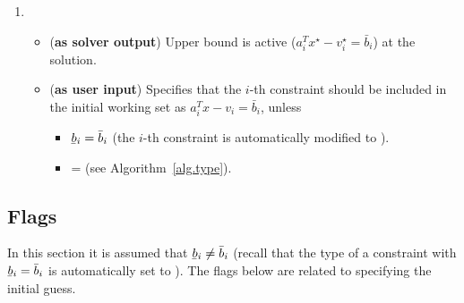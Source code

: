 \documentclass[12pt,a4paper]{article}
\newcommand{\ubar}[1]{\underaccent{\bar}{#1}}
\begin{document}
\begin{enumerate}
\item {}

  \begin{itemize}
  \item ({\bf as solver output}) Upper bound is active ($a_i^Tx^{\star} - v_i^{\star} = \bar{b}_i$) at the solution.
  \item ({\bf as user input}) Specifies that the $i$-th constraint should be included in the
    initial working set as $a_i^Tx - v_i = \bar{b}_i$, unless
    \begin{itemize}
    \item[\ding{237}] $\ubar{b}_i = \bar{b}_i$ (the $i$-th constraint is automatically modified to
      ).
    \item[\ding{237}]  =  (see Algorithm~\ref{alg.type}).
    \end{itemize}
  \end{itemize}

\end{enumerate}

\subsection{Flags}

In this section it is assumed that $\ubar{b}_i \neq \bar{b}_i$ (recall that the type of a constraint
with $\ubar{b}_i = \bar{b}_i$ is automatically set to ). The flags below are related
to specifying the initial guess.
\end{document}
